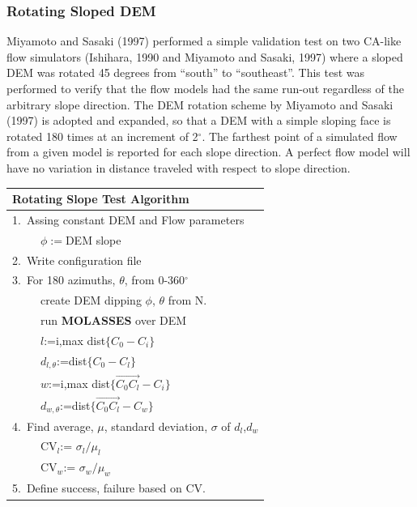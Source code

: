 \documentclass[12pt,letter]{article}
\newcommand{\tabitem}{~~\llap{\textbullet}~~}
\begin{document}
		\subsubsection{Rotating Sloped DEM}
			Miyamoto and Sasaki (1997) performed a simple validation test on two CA-like flow simulators (Ishihara, 1990 and Miyamoto and Sasaki, 1997) where a sloped DEM was rotated 45 degrees from ``south'' to ``southeast''. This test was performed to verify that the flow models had the same run-out regardless of the arbitrary slope direction. The DEM rotation scheme by Miyamoto and Sasaki (1997) is adopted and expanded, so that a DEM with a simple sloping face is rotated 180 times at an increment of 2$^{\circ}$. The farthest point of a simulated flow from a given model is reported for each slope direction. A perfect flow model will have no variation in distance traveled with respect to slope direction.

			\begin{center}
				\begin{tabular}{l}
					\toprule
					\textbf{Rotating Slope Test Algorithm}\\
					\midrule
					1.~Assing constant DEM and Flow parameters\\
						~\tabitem $\phi:=$DEM slope\\
					2.~Write configuration file\\
					3.~For 180 azimuths, $\theta$, from 0-360$^{\circ}$\\
						~\tabitem create DEM dipping $\phi$, $\theta$ from N.\\
						~\tabitem run \textbf{MOLASSES} over DEM\\
						~\tabitem $l$:=i,max dist$\{C_0-C_i\}$\\
						~\tabitem $d_{l,\theta}$:=dist$\{C_0-C_l\}$\\
						~\tabitem $w$:=i,max dist$\{\overrightarrow{C_0C_l}-C_i\}$\\
						~\tabitem $d_{w,\theta}$:=dist$\{\overrightarrow{C_0C_l}-C_w\}$\\
					4.~Find average, $\mu$, standard deviation, $\sigma$ of $d_l$,$d_w$\\
						~\tabitem CV$_l$:= $\sigma_l/\mu_l$\\
						~\tabitem CV$_w$:= $\sigma_w/\mu_w$\\
					5.~Define success, failure based on CV.\\
					\bottomrule
				\end{tabular}
			\end{center}
\end{document}
